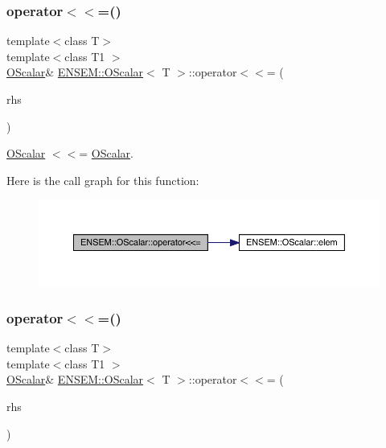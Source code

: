 \subsubsection{\texorpdfstring{operator$<$$<$=()}{operator<<=()}\hspace{0.1cm}{\footnotesize\ttfamily [2/3]}}
{\footnotesize\ttfamily template$<$class T$>$ \\
template$<$class T1 $>$ \\
\mbox{\hyperlink{classENSEM_1_1OScalar}{O\+Scalar}}\& \mbox{\hyperlink{classENSEM_1_1OScalar}{E\+N\+S\+E\+M\+::\+O\+Scalar}}$<$ T $>$\+::operator$<$$<$= (\begin{DoxyParamCaption}\item[{const \mbox{\hyperlink{classENSEM_1_1OScalar}{O\+Scalar}}$<$ T1 $>$ \&}]{rhs }\end{DoxyParamCaption})\hspace{0.3cm}{\ttfamily [inline]}}



\mbox{\hyperlink{classENSEM_1_1OScalar}{O\+Scalar}} $<$$<$= \mbox{\hyperlink{classENSEM_1_1OScalar}{O\+Scalar}}. 

Here is the call graph for this function\+:
\nopagebreak
\begin{figure}[H]
\begin{center}
\leavevmode
\includegraphics[width=350pt]{da/d80/classENSEM_1_1OScalar_a93607b92c63ae779d9d3ed131df3f449_cgraph}
\end{center}
\end{figure}
\mbox{\label{classENSEM_1_1OScalar_a93607b92c63ae779d9d3ed131df3f449}} 
\subsubsection{\texorpdfstring{operator$<$$<$=()}{operator<<=()}\hspace{0.1cm}{\footnotesize\ttfamily [3/3]}}
{\footnotesize\ttfamily template$<$class T$>$ \\
template$<$class T1 $>$ \\
\mbox{\hyperlink{classENSEM_1_1OScalar}{O\+Scalar}}\& \mbox{\hyperlink{classENSEM_1_1OScalar}{E\+N\+S\+E\+M\+::\+O\+Scalar}}$<$ T $>$\+::operator$<$$<$= (\begin{DoxyParamCaption}\item[{const \mbox{\hyperlink{classENSEM_1_1OScalar}{O\+Scalar}}$<$ T1 $>$ \&}]{rhs }\end{DoxyParamCaption})\hspace{0.3cm}{\ttfamily [inline]}}



